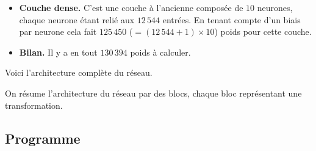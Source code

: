 \documentclass[11pt,class=report,crop=false]{standalone}
\begin{document}
\begin{itemize}
    
  
  \item \textbf{Couche dense.}
  C'est une couche \og{}à l'ancienne\fg{} composée de $10$ neurones, chaque neurone étant relié aux $12\,544$ entrées. En tenant compte d'un biais par neurone cela fait
  $125\,450$ ($= (12\,544+1) \times 10$) poids pour cette couche.
  

  
  \item \textbf{Bilan.} Il y a en tout $130\,394$ poids à calculer.
  
\end{itemize}


Voici l'architecture complète du réseau.


On résume l'architecture du réseau par des blocs, chaque bloc représentant une transformation.

\subsection{Programme}
\end{document}
